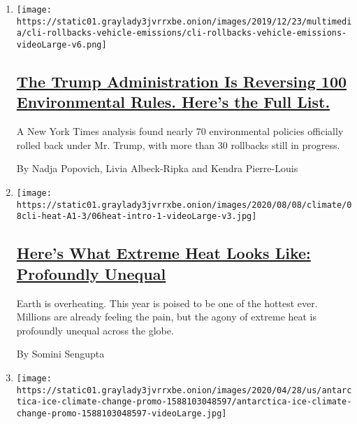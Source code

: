 \begin{enumerate}
\def\labelenumi{\arabic{enumi}.}
\item
  \texttt{[image: https://static01.graylady3jvrrxbe.onion/images/2019/12/23/multimedia/cli-rollbacks-vehicle-emissions/cli-rollbacks-vehicle-emissions-videoLarge-v6.png]}

  \hypertarget{the-trump-administration-is-reversing-100-environmental-rules-heres-the-full-list}{%
  \subsection{\texorpdfstring{\href{/interactive/2020/climate/trump-environment-rollbacks.html}{The
  Trump Administration Is Reversing 100 Environmental Rules. Here's the
  Full
  List.}}{The Trump Administration Is Reversing 100 Environmental Rules. Here's the Full List.}}\label{the-trump-administration-is-reversing-100-environmental-rules-heres-the-full-list}}

  A New York Times analysis found nearly 70 environmental policies
  officially rolled back under Mr. Trump, with more than 30 rollbacks
  still in progress.

  By Nadja Popovich, Livia Albeck-Ripka and Kendra Pierre-Louis
\item
  \texttt{[image: https://static01.graylady3jvrrxbe.onion/images/2020/08/08/climate/08cli-heat-A1-3/06heat-intro-1-videoLarge-v3.jpg]}

  \hypertarget{heres-what-extreme-heat-looks-like-profoundly-unequal}{%
  \subsection{\texorpdfstring{\href{/interactive/2020/08/06/climate/climate-change-inequality-heat.html}{Here's
  What Extreme Heat Looks Like: Profoundly
  Unequal}}{Here's What Extreme Heat Looks Like: Profoundly Unequal}}\label{heres-what-extreme-heat-looks-like-profoundly-unequal}}

  Earth is overheating. This year is poised to be one of the hottest
  ever. Millions are already feeling the pain, but the agony of extreme
  heat is profoundly unequal across the globe.

  By Somini Sengupta
\item
  \texttt{[image: https://static01.graylady3jvrrxbe.onion/images/2020/04/28/us/antarctica-ice-climate-change-promo-1588103048597/antarctica-ice-climate-change-promo-1588103048597-videoLarge.jpg]}

  \hypertarget{a-satellite-lets-scientists-see-antarcticas-melting-like-never-before}{%
}
\end{enumerate}
